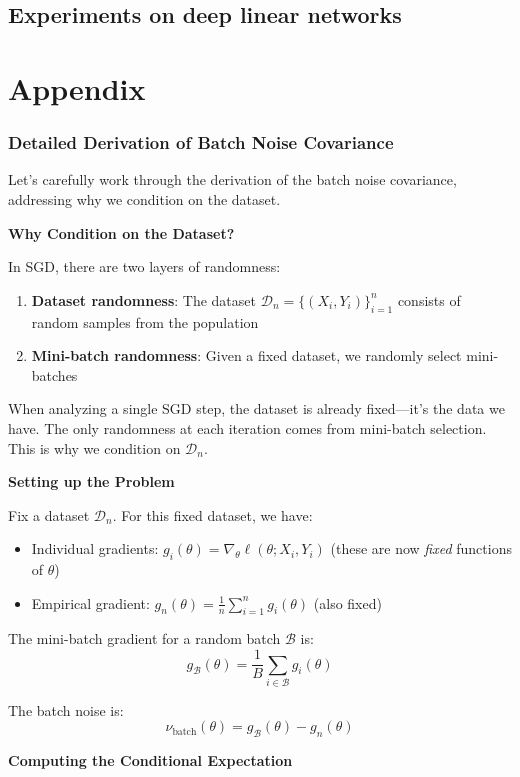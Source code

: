 \documentclass[11pt]{article}
\begin{document}
\subsection{Experiments on deep linear networks}
\section{Appendix}
\subsubsection{Detailed Derivation of Batch Noise Covariance}

Let's carefully work through the derivation of the batch noise covariance, addressing why we condition on the dataset.

\textbf{Why Condition on the Dataset?}

In SGD, there are two layers of randomness:
\begin{enumerate}
    \item \textbf{Dataset randomness}: The dataset $\mathcal{D}_n = \{(X_i, Y_i)\}_{i=1}^n$ consists of random samples from the population
    \item \textbf{Mini-batch randomness}: Given a fixed dataset, we randomly select mini-batches
\end{enumerate}

When analyzing a single SGD step, the dataset is already fixed—it's the data we have. The only randomness at each iteration comes from mini-batch selection. This is why we condition on $\mathcal{D}_n$.

\textbf{Setting up the Problem}

Fix a dataset $\mathcal{D}_n$. For this fixed dataset, we have:
\begin{itemize}
    \item Individual gradients: $g_i(\theta) = \nabla_\theta \ell(\theta; X_i, Y_i)$ (these are now \textit{fixed} functions of $\theta$)
    \item Empirical gradient: $g_n(\theta) = \frac{1}{n} \sum_{i=1}^n g_i(\theta)$ (also fixed)
\end{itemize}

The mini-batch gradient for a random batch $\mathcal{B}$ is:
$$g_{\mathcal{B}}(\theta) = \frac{1}{B} \sum_{i \in \mathcal{B}} g_i(\theta)$$

The batch noise is:
$$\nu_{\text{batch}}(\theta) = g_{\mathcal{B}}(\theta) - g_n(\theta)$$

\textbf{Computing the Conditional Expectation}
\end{document}
